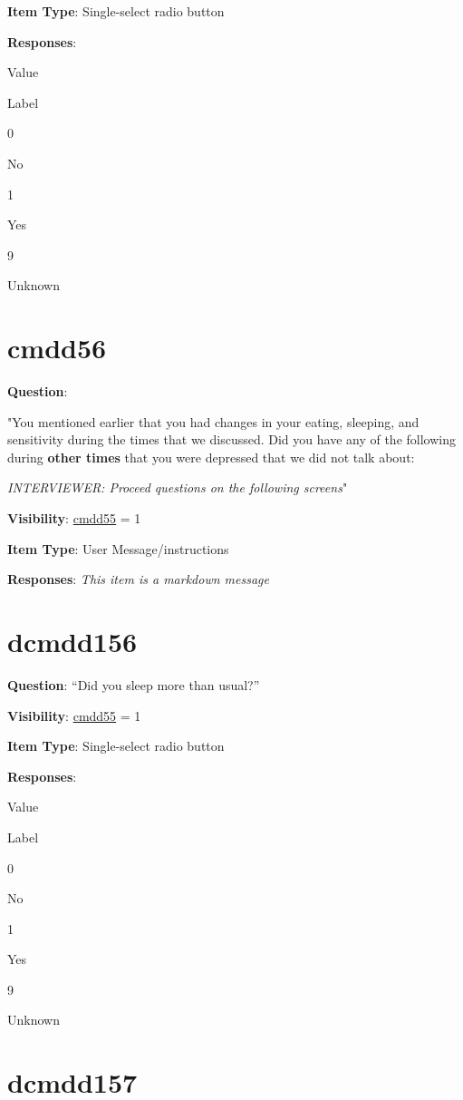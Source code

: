 \documentclass[
]{book}
\begin{document}
\textbf{Item Type}: Single-select radio button

\textbf{Responses}:

Value

Label

0

No

1

Yes

9

Unknown

\hypertarget{cmdd56}{%
\section{cmdd56}\label{cmdd56}}

\textbf{Question}:

"You mentioned earlier that you had changes in your eating, sleeping, and sensitivity during the times that we discussed. Did you have any of the following during \textbf{other times} that you were depressed that we did not talk about:

\emph{INTERVIEWER: Proceed questions on the following screens}"

\textbf{Visibility}: \protect\hyperlink{cmdd55}{cmdd55} = 1

\textbf{Item Type}: User Message/instructions

\textbf{Responses}: \emph{This item is a markdown message}

\hypertarget{dcmdd156}{%
\section{dcmdd156}\label{dcmdd156}}

\textbf{Question}: ``Did you sleep more than usual?''

\textbf{Visibility}: \protect\hyperlink{cmdd55}{cmdd55} = 1

\textbf{Item Type}: Single-select radio button

\textbf{Responses}:

Value

Label

0

No

1

Yes

9

Unknown

\hypertarget{dcmdd157}{%
\section{dcmdd157}\label{dcmdd157}}
\end{document}
